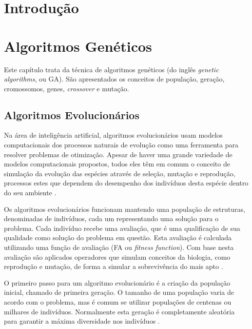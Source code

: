 \documentclass[12pt,oneside,a4paper,english,french,spanish,brazil,]{abntex2}
\begin{document}
\chapter{Introdução}

\chapter{Algoritmos Genéticos}

Este capítulo trata da técnica de algoritmos genéticos (do inglês \textit{genetic algorithms}, ou GA). São apresentados os conceitos de população, geração, cromossomos, genes, \textit{crossover} e mutação.

\section{Algoritmos Evolucionários}

Na área de inteligência artificial, algoritmos evolucionários usam modelos computacionais dos processos naturais de evolução como uma ferramenta para resolver problemas de otimização. Apesar de haver uma grande variedade de modelos computacionais propostos, todos eles têm em comum o conceito de simulação da evolução das espécies através de seleção, mutação e reprodução, processos estes que dependem do desempenho dos indivíduos desta espécie dentro do seu ambiente \cite{linden:2008}.

Os algoritmos evolucionários funcionam mantendo uma população de estruturas, denominadas de indivíduos, cada um representando uma solução para o problema. Cada indivíduo recebe uma avaliação, que é uma qualificação de sua qualidade como solução do problema em questão. Esta avaliação é calculada utilizando uma função de avaliação (FA ou \textit{fitness function}). Com base nesta avaliação são aplicados operadores que simulam conceitos da biologia, como reprodução e mutação, de forma a simular a sobrevivência do mais apto \cite{linden:2008}.

O primeiro passo para um algoritmo evolucionário é a criação da população inicial, chamado de primeira geração. O tamanho de uma população varia de acordo com o problema, mas é comum se utilizar populações de centenas ou milhares de indivíduos. Normalmente esta geração é completamente aleatória para garantir a máxima diversidade nos indivíduos \cite{linden:2008}.
\end{document}
